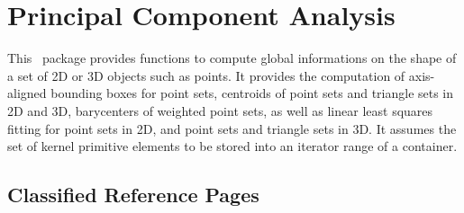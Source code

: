 
\chapter{Principal Component Analysis}
\label{ref_chapter_pca}




This \cgal\ package provides functions to compute global informations
on the shape of a set of 2D or 3D objects such as points. It provides the computation of axis-aligned bounding boxes for point sets, centroids of point sets and triangle sets in 2D and 3D, barycenters of weighted point sets, as well as linear least squares fitting for point sets in 2D, and point sets and triangle sets in 3D. It assumes the set of kernel primitive elements to be stored into an iterator range of a container.




\section{Classified Reference Pages}


\\
\\
\\
\\

